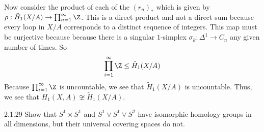 \documentclass{article}
\begin{document}
\begin{solution}{\parindent}
  Now consider the product of each of the $(r_n)_\ast$ which is given
  by $\rho: \tilde{H}_1(X/A) \to \prod_{n=1}^\infty \Z$. This is a
  direct product and not a direct sum because every loop in $X/A$
  corresponds to a distinct sequence of integers. This map must be
  surjective because because there is a singular $1$-simplex
  $\sigma_k: \Delta^1 \to C_n$ any given number of times. So 
  \[
  \prod_{i=1}^\infty \Z \leq \tilde{H}_1(X/A)
  \]
  Because $\prod_{i=1}^\infty \Z$ is uncountable, we see that
  $\tilde{H}_1(X/A)$ is uncountable. Thus, we see that $H_1(X,A)
  \not\cong \tilde{H}_1(X/A)$.
\end{solution}

\begin{exercise}{2.1.29}{\parindent}
  Show that $S^1 \times S^1$ and $S^1 \vee S^1\vee S^2$ have
  isomorphic homology groups in all dimensions, but their universal
  covering spaces do not.
\end{exercise}
\end{document}
